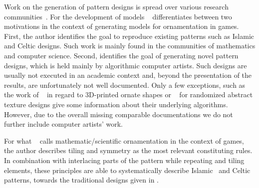 
Work on the generation of pattern designs is spread over various research communities~\cite{whitehead_2010_tpd}. For the development of models \citeauthor*{whitehead_2010_tpd}~\cite{whitehead_2010_tpd} differentiates between two motivations in the context of generating models for ornamentation in games. First, the author identifies the goal to reproduce existing patterns such as Islamic and Celtic designs. Such work is mainly found in the communities of mathematics and computer science. Second, \citeauthor*{whitehead_2010_tpd} identifies the goal of generating novel pattern designs, which is held mainly by algorithmic computer artists. Such designs are usually not executed in an academic context and, beyond the presentation of the results, are unfortunately not well documented. Only a few exceptions, such as the work of \citeauthor*{takayama_2016_med}~\cite{takayama_2016_med} in regard to 3D-printed ornate shapes or \citeauthor*{alvarez_2019_ido}~\cite{alvarez_2019_ido} for randomized abstract texture designs give some information about their underlying algorithms. However, due to the overall missing comparable documentations we do not further include computer artists' work.

For what \citeauthor*{whitehead_2010_tpd}~\cite{whitehead_2010_tpd} calls mathematic/scientific ornamentation in the context of games, the author 
% 
describes tiling and symmetry as the most relevant constituting rules. In combination with interlacing parts of the pattern while repeating and tiling elements, these principles are able to systematically describe Islamic~\cite{ostromoukhov_1998_mtc} and Celtic~\cite{cromwell_1993_ckm} patterns, towards the traditional designs given in .

